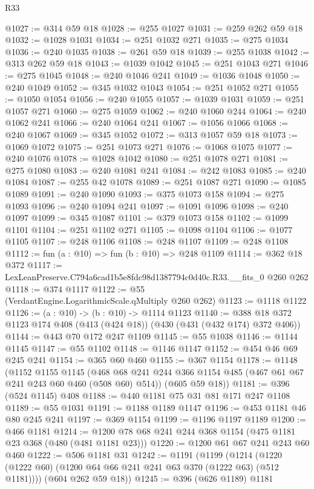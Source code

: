 \begin{lexlean}{R33}
\begin{coremodule}
@1027 := @314 @59 @18
@1028 := @255 @1027
@1031 := @259 @262 @59 @18
@1032 := @1028 @1031
@1034 := @251 @1032 @271
@1035 := @275 @1034
@1036 := @240 @1035
@1038 := @261 @59 @18
@1039 := @255 @1038
@1042 := @313 @262 @59 @18
@1043 := @1039 @1042
@1045 := @251 @1043 @271
@1046 := @275 @1045
@1048 := @240 @1046 @241
@1049 := @1036 @1048
@1050 := @240 @1049
@1052 := @345 @1032 @1043
@1054 := @251 @1052 @271
@1055 := @1050 @1054
@1056 := @240 @1055
@1057 := @1039 @1031
@1059 := @251 @1057 @271
@1060 := @275 @1059
@1062 := @240 @1060 @244
@1064 := @240 @1062 @241
@1066 := @240 @1064 @241
@1067 := @1056 @1066
@1068 := @240 @1067
@1069 := @345 @1052
@1072 := @313 @1057 @59 @18
@1073 := @1069 @1072
@1075 := @251 @1073 @271
@1076 := @1068 @1075
@1077 := @240 @1076
@1078 := @1028 @1042
@1080 := @251 @1078 @271
@1081 := @275 @1080
@1083 := @240 @1081 @241
@1084 := @242 @1083
@1085 := @240 @1084
@1087 := @255 @42 @1078
@1089 := @251 @1087 @271
@1090 := @1085 @1089
@1091 := @240 @1090
@1093 := @375 @1073 @158
@1094 := @275 @1093
@1096 := @240 @1094 @241
@1097 := @1091 @1096
@1098 := @240 @1097
@1099 := @345 @1087
@1101 := @379 @1073 @158
@1102 := @1099 @1101
@1104 := @251 @1102 @271
@1105 := @1098 @1104
@1106 := @1077 @1105
@1107 := @248 @1106
@1108 := @248 @1107
@1109 := @248 @1108
@1112 := fun (a : @10) => fun (b : @10) => @248 @1109
@1114 := @362 @18 @372
@1117 := LexLeanPreserve.C794a6cad1b5e8fdc98d1387794c0d40c.R33.__fits_0 @260 @262
@1118 := @374 @1117
@1122 := @55 (VerdantEngine.LogarithmicScale.qMultiply @260 @262)
@1123 := @1118 @1122
@1126 := (a : @10) -> (b : @10) -> @1114 @1123
@1140 := @388 @18 @372 @1123 @174 @408 (@413 (@424 @18)) (@430 (@431 (@432 @174) @372 @406))
@1144 := @443 @70 @172 @247 @1109
@1145 := @55 @1038
@1146 := @1144 @1145
@1147 := @55 @1102
@1148 := @1146 @1147
@1152 := @454 @46 @69 @245 @241
@1154 := @365 @60 @460
@1155 := @367 @1154
@1178 := @1148
    (@1152
      @1155
      @1145
      (@468 @68 @241 @244 @366 @1154 @485 (@467 @61 @67 @241 @243 @60 @460 (@508 @60) @514))
      (@605 @59 @18))
@1181 := @396 (@524 @1145) @408
@1188 := @440 @1181 @75 @31 @81 @171 @247 @1108
@1189 := @55 @1031
@1191 := @1188 @1189 @1147
@1196 := @453 @1181 @46 @80 @245 @241
@1197 := @369 @1154
@1199 := @1196 @1197 @1189
@1200 := @466 @1181
@1214 := @1200 @78 @68 @241 @244 @368 @1154 (@475 @1181 @23 @368 (@480 (@481 @1181 @23)))
@1220 := @1200 @61 @67 @241 @243 @60 @460
@1222 := @506 @1181 @31
@1242 := @1191
    (@1199
      (@1214 (@1220 (@1222 @60) (@1200 @64 @66 @241 @241 @63 @370 (@1222 @63) (@512 @1181))))
      (@604 @262 @59 @18))
@1245 := @396 (@626 @1189) @1181

\end{coremodule}
\end{lexlean}
